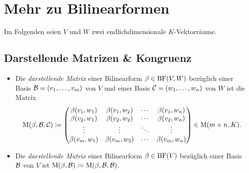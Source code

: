 \chapter{Mehr zu Bilinearformen}

Im Folgenden seien $V$ und $W$ zwei endlichdimensionale $K$-Vektorräume.





\section{Darstellende Matrizen \& Kongruenz}

\begin{definition}
  \label{definition: representing matrix for a bilinear form}
  \leavevmode
  \begin{itemize}
    \item
      Die \emph{darstellende Matrix} einer Bilinearform $\beta \in \operatorname{BF}(V,W)$ bezüglich einer Basis $\mathcal{B} = (v_1, \dotsc, v_m)$ von $V$ und einer Basis $\mathcal{C} = (w_1, \dotsc, w_n)$ von $W$ ist die Matrix
      \[
                  \operatorname{M}(\beta, \mathcal{B}, \mathcal{C})
        \coloneqq \begin{pmatrix}
                    \beta(v_1, w_1) & \beta(v_1, w_2) & \cdots  & \beta(v_1, w_n) \\
                    \beta(v_2, w_1) & \beta(v_2, w_2) & \cdots  & \beta(v_2, w_n) \\
                    \vdots          & \vdots          & \ddots  & \vdots          \\
                    \beta(v_m, w_1) & \beta(v_m, w_2) & \cdots  & \beta(v_m, w_n)
                  \end{pmatrix}
                  \in \operatorname{M}(m \times n, K).
      \]
    \item
      Die \emph{darstellende Matrix} einer Bilinearform $\beta \in \operatorname{BF}(V)$ bezüglich einer Basis $\mathcal{B}$ von $V$ ist $\operatorname{M}(\beta, \mathcal{B}) \coloneqq \operatorname{M}(\beta, \mathcal{B}, \mathcal{B})$.
  \end{itemize}
\end{definition}

